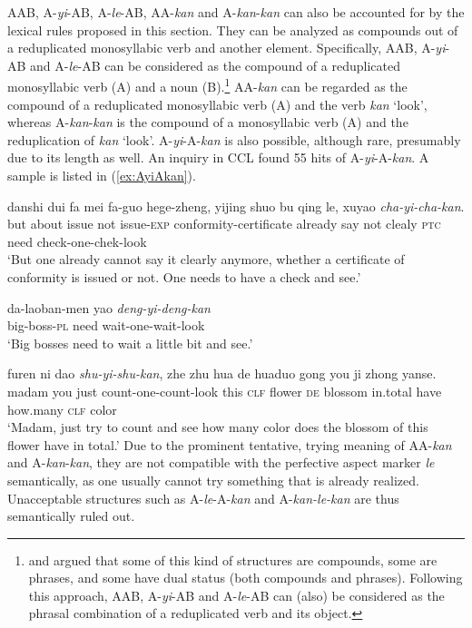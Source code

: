 \documentclass[11pt,a4paper,fleqn,draft]{article}
\let\textbf\emph
\begin{document}
AAB, A-\emph{yi}-AB, A-\emph{le}-AB, AA-\emph{kan} and A-\emph{kan}-\emph{kan} can also be accounted for by the lexical rules proposed in this section.
They can be analyzed as compounds out of a reduplicated monosyllabic verb and another element.
Specifically, AAB, A-\emph{yi}-AB and A-\emph{le}-AB can be considered as the compound of a reduplicated monosyllabic verb (A) and a noun (B).\footnote{
\citet{Huang1984} and \citet{Her1996, Her2010} argued that some of this kind of structures are compounds, some are phrases, and some have dual status (both compounds and phrases).
Following this approach, AAB, A-\emph{yi}-AB and A-\emph{le}-AB can (also) be considered as the phrasal combination of a reduplicated verb and its object.
}
AA-\emph{kan} can be regarded as the compound of a reduplicated monosyllabic verb (A) and the verb \emph{kan} `look',
whereas A-\emph{kan}-\emph{kan} is the compound of a monosyllabic verb (A) and the reduplication of \emph{kan} `look'.
A-\emph{yi}-A-\emph{kan} is also possible, although rare, presumably due to its length as well.
An inquiry in CCL found 55 hits of A-\emph{yi}-A-\emph{kan}.
A sample is listed in (\ref{ex:AyiAkan}).

\ea\label{ex:AyiAkan}
  \ea
  \gll danshi dui fa mei fa-guo hege-zheng, yijing shuo bu qing le, xuyao \textbf{cha-yi-cha-kan}.\\
  but about issue not issue-\textsc{exp} conformity-certificate already say not clealy \textsc{ptc} need check-one-chek-look\\ 
  \glt `But one already cannot say it clearly anymore, whether a certificate of conformity is issued or not. One needs to have a check and see.'
  
  \ex
  \gll da-laoban-men yao \textbf{deng-yi-deng-kan}\\
  big-boss-\textsc{pl} need wait-one-wait-look\\ 
  \glt `Big bosses need to wait a little bit and see.'
  
  \ex
  \gll furen ni dao \textbf{shu-yi-shu-kan}, zhe zhu hua de huaduo gong you ji zhong yanse.\\
  madam you just count-one-count-look this \textsc{clf} flower \textsc{de} blossom in.total have how.many \textsc{clf} color\\ 
  \glt `Madam, just try to count and see how many color does the blossom of this flower have in total.'
  \z
\z
Due to the prominent tentative, trying meaning of AA-\emph{kan} and A-\emph{kan}-\emph{kan}, they are not compatible with the perfective aspect marker \emph{le} semantically,
as one usually cannot try something that is already realized.
Unacceptable structures such as  A\hyp{}\emph{le}\hyp{}A\hyp{}\emph{kan} and A\hyp{}\emph{kan\hyp{}le\hyp{}kan} are thus semantically ruled out.
\end{document}
